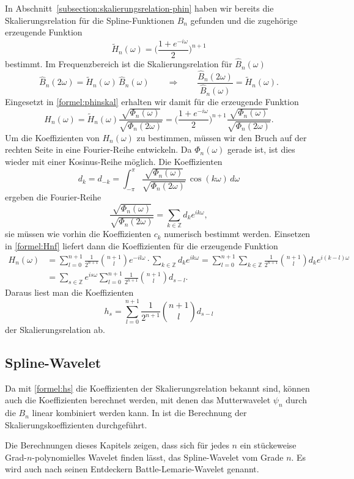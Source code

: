 In Abschnitt~\ref{subsection:skalierungsrelation-phin} haben wir bereits
die Skalierungsrelation für die Spline-Funktionen $B_n$ gefunden und die
zugehörige erzeugende Funktion
\[
\tilde{H}_n(\omega) = \biggl(\frac{1+e^{-i\omega}}{2}\biggr)^{n+1}
\]
bestimmt.
Im Frequenzbereich ist die Skalierungsrelation für $\hat{B}_n(\omega)$
\[
\hat{B}_n(2\omega)=\tilde{H}_n(\omega) \, \hat{B}_n(\omega)
\qquad\Rightarrow\qquad
\frac{\hat{B}_n(2\omega)}{\hat{B}_n(\omega)}
=
\tilde{H}_n(\omega).
\]
Eingesetzt in \eqref{formel:phinskal} erhalten wir damit für die 
erzeugende Funktion 
\begin{equation}
H_n(\omega)
=
\tilde{H}_n(\omega)
\frac{\sqrt{\Phi_n(\omega)}}{\sqrt{\Phi_n(2\omega)}}
=
\biggl(
\frac{1+e^{-i\omega}}{2}
\biggr)^{n+1}
\frac{\sqrt{\Phi_n(\omega)}}{\sqrt{\Phi_n(2\omega)}}.
\label{formel:Hnf}
\end{equation}
Um die Koeffizienten von $H_n(\omega)$ zu bestimmen, müssen wir den
Bruch auf der rechten Seite in eine Fourier-Reihe entwickeln.
Da $\Phi_n(\omega)$ gerade ist, ist dies wieder mit einer Kosinus-Reihe
möglich.
Die Koeffizienten
\[
d_k
=
d_{-k}
=
\int_{-\pi}^\pi
\frac{\sqrt{\Phi_n(\omega)}}{\sqrt{\Phi_n(2\omega)}}
\,\cos(k\omega)
\,d\omega
\]
ergeben die Fourier-Reihe
\[
\frac{\sqrt{\Phi_n(\omega)}}{\sqrt{\Phi_n(2\omega)}}
=
\sum_{k\in\mathbb Z} d_k e^{ik\omega},
\]
sie müssen wie vorhin die Koeffizienten $c_k$ numerisch bestimmt werden.
Einsetzen in \eqref{formel:Hnf} liefert dann die Koeffizienten für die
erzeugende Funktion
\begin{align*}
H_n(\omega)
&=
\sum_{l=0}^{n+1} \frac1{2^{n+1}} \binom{n+1}{l} e^{-il\omega}
\cdot
\sum_{k\in\mathbb Z} d_ke^{ik\omega}
=
\sum_{l=0}^{n+1}
\sum_{k\in\mathbb Z}
\frac{1}{2^{n+1}}
\binom{n+1}{l}d_k
e^{i(k-l)\omega}
\\
&=
\sum_{s\in\mathbb Z}
e^{is\omega}
\sum_{l=0}^{n+1}
\frac{1}{2^{n+1}}
\binom{n+1}{l}d_{s-l}.
\end{align*}
Daraus liest man die Koeffizienten
\begin{equation}
h_s
= 
\sum_{l=0}^{n+1}
\frac{1}{2^{n+1}}
\binom{n+1}{l}d_{s-l}
\label{formel:hs}
\end{equation}
der Skalierungsrelation ab.

\subsection{Spline-Wavelet
\label{subsection:spline-wavelet}}
Da mit \eqref{formel:hs} die Koeffizienten der Skalierungsrelation bekannt
sind, können auch die Koeffizienten berechnet werden, mit denen das
Mutterwavelet $\psi_n$ durch die $B_n$ linear kombiniert werden kann.
In \cite{buch:blatter} ist die Berechnung der Skalierungskoeffizienten 
durchgeführt.

Die Berechnungen dieses Kapitels zeigen, dass sich für jedes $n$ ein 
stückeweise Grad-$n$-po\-ly\-no\-mi\-elles Wavelet finden lässt,
das Spline-Wavelet vom Grade $n$.
Es wird auch nach seinen Entdeckern Battle-Lemarie-Wavelet genannt.





